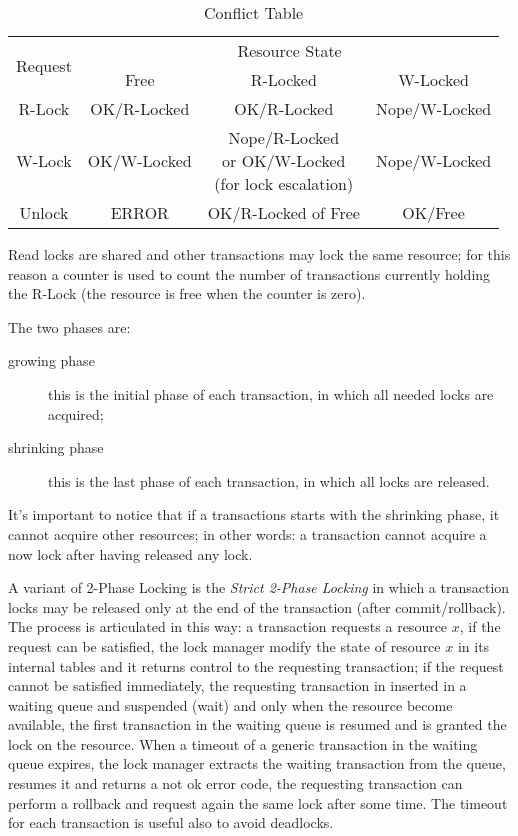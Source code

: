 \begin{table}[h]
	\centering
	\begin{tabular}{c|c|c|c}
		\multicolumn{1}{c|}{\multirow{2}{*}{Request}} & \multicolumn{3}{c}{Resource State} \\ \cline{2-4}
		& Free & R-Locked & W-Locked \\ \hline
		R-Lock & OK/R-Locked & OK/R-Locked & Nope/W-Locked \\ \hline
		W-Lock & OK/W-Locked & \parbox[l]{3cm}{Nope/R-Locked\\or OK/W-Locked\\(for lock escalation)} & Nope/W-Locked \\ \hline
		Unlock & ERROR & OK/R-Locked of Free & OK/Free \\
	\end{tabular}
	\caption{Conflict Table}
\end{table}
Read locks are shared and other transactions may lock the same resource; for this reason a counter is used to count the number of transactions currently holding the R-Lock (the resource is free when the counter is zero).

The two phases are:
\begin{description}
	\item[growing phase] this is the initial phase of each transaction, in which all needed locks are acquired;
	\item[shrinking phase] this is the last phase of each transaction, in which all locks are released.
\end{description}
It's important to notice that if a transactions starts with the shrinking phase, it cannot acquire other resources; in other words: a transaction cannot acquire a now lock after having released any lock.

A variant of 2-Phase Locking is the \emph{Strict 2-Phase Locking} in which a transaction locks may be released only at the end of the transaction (after commit/rollback).
The process is articulated in this way: a transaction requests a resource $x$, if the request can be satisfied, the lock manager modify the state of resource $x$ in its internal tables and it returns control to the requesting transaction; if the request cannot be satisfied immediately, the requesting transaction in inserted in a waiting queue and suspended (wait) and only when the resource become available, the first transaction in the waiting queue is resumed and is granted the lock on the resource.
When a timeout of a generic transaction in the waiting queue expires, the lock manager extracts the waiting transaction from the queue, resumes it and returns a not ok error code, the requesting transaction can perform a rollback and request again the same lock after some time.
The timeout for each transaction is useful also to avoid deadlocks.